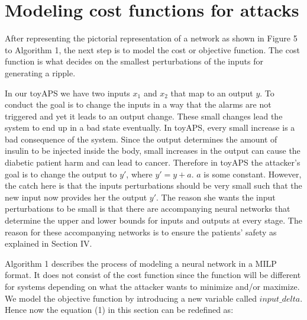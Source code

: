 \section{Modeling cost functions for attacks}
\label{section:costfunction}
After representing the pictorial representation of a network as shown in Figure 5 to Algorithm 1, the next step is to model the cost or objective function. The cost function is what decides on the smallest perturbations of the inputs for generating a ripple. 

In our toyAPS we have two inputs $x_1$ and $x_2$ that map to an output $y$. To conduct \attack the goal is to change the inputs in a way that the alarms are not triggered and yet it leads to an output change. These small changes lead the system to end up in a bad state eventually. In toyAPS, every small increase is a bad consequence of the system. Since the output determines the amount of insulin to be injected inside the body, small increases in the output can cause the diabetic patient harm \cite{ZHANG2019403} and can lead to cancer. 
Therefore in toyAPS the attacker's goal is to change the output to $y'$, where $y' = y + a$. $a$ is some constant. %
However, the catch here is that the inputs perturbations should be very small such that the new input now provides her the output $y'$.  The reason she wants the input perturbations to be small is that there are accompanying neural networks that determine the upper and lower bounds for inputs and outputs at every stage. The reason for these accompanying networks is to ensure the patients' safety as explained in Section IV.%

Algorithm 1 describes the process of modeling a neural network in a MILP format. It does not consist of the cost function since the function will be different for systems depending on what the attacker wants to minimize and/or maximize. We model the objective function by introducing a new variable called $input\_delta$. Hence now the equation (1) in this section can be redefined as:

